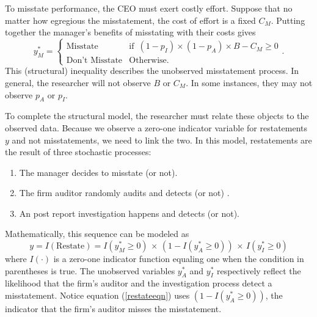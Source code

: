 \documentclass[14pt]{article}
\begin{document}
To misstate performance, the CEO must exert costly effort. Suppose that no matter how 
egregious the misstatement, the cost of effort is a fixed $C_M$. Putting together the manager's 
benefits of misstating with their costs gives
\begin{equation}\label{bencost}
y_M^* = \begin{cases}\mbox{Misstate} & \mbox{if }\, (1-p_I) \times (1-p_A) \times B - C_M \ge 0\\
\mbox{Don't Misstate} & \mbox{Otherwise}.\end{cases}.\end{equation}
This (structural) inequality describes the unobserved misstatement process. In general, the researcher
will not observe $B$ or $C_M$. In some instances, they may not observe $p_A$ or $p_I$.

To complete the structural model, the researcher must relate these objects to the observed data.
Because we observe a zero-one indicator variable for restatements $y$ and not misstatements,
we need to link the two. In this model, restatements are the result of three stochastic processes:

\begin{enumerate}
\item The manager decides to misstate (or not).
\item The firm auditor randomly audits and detects (or not) .
\item An post report investigation happens and detects (or not).
\end{enumerate}

Mathematically, this sequence can be modeled as
\begin{equation}\label{restateeqn}
 y = I(\mbox{Restate}) = I(y^*_M \ge 0) \, \times\, (1 - I(y^*_A \ge 0)) \, \times\, I(y^*_I \ge 0)
\end{equation}
where $I(\cdot)$ is a zero-one indicator function equaling one when the condition in parentheses is true.
The unobserved variables $y^*_A$ and $y^*_I$ respectively reflect the likelihood that the firm's
auditor and the investigation process detect a misstatement. Notice equation (\ref{restateeqn})
uses $(1 - I(y^*_A \ge 0))$, the indicator that the firm's auditor misses the misstatement.
\end{document}
